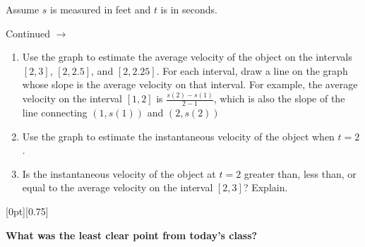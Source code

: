 \documentclass[11pt]{article}
\newcommand{\cuthere}{%
\noindent
\raisebox{-2.8pt}[0pt][0.75\baselineskip]{\small\ding{34}}
\unskip{\tiny\dotfill}
}
\def\ra{\rightarrow}
\def\pageturn{\vfill 
\begin{flushright}
	\begin{small}
		Continued $\ra$
	\end{small}
\end{flushright} \newpage}
\begin{document}
Assume $s$ is measured in feet and $t$ is in seconds. 

\pageturn

\begin{enumerate}
	\item Use the graph to estimate the average velocity of the object on the intervals $[2,3]$, $[2,2.5]$, and $[2, 2.25]$. For each interval, draw a line on the graph whose slope is the average velocity on that interval. For example, the average velocity on the interval $[1,2]$ is $\frac{s(2)-s(1)}{2-1}$, which is also the slope of the line connecting $(1, s(1))$ and $(2, s(2))$ 
		
	\vspace{2in}
	
	\item Use the graph to estimate the instantaneous velocity of the object when $t=2$. 
	
	\vspace{1.5in}
	
	\item Is the instantaneous velocity of the object at $t=2$ greater than, less than, or equal to the average velocity on the interval $[2,3]$? Explain. 
\end{enumerate}




\vfill

\cuthere

\noindent
\textbf{What was the least clear point from today's class?}

\vspace{1in}
\end{document}
